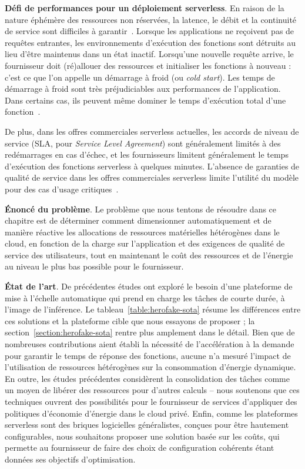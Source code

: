 \textbf{Défi de performances pour un déploiement serverless}. En raison de la nature éphémère des ressources non réservées, la latence, le débit et la continuité de service sont difficiles à garantir~\cite{vaneykSPECRGCloud2018, dartoisCuckooOpportunisticMapReduce2019}. Lorsque les applications ne reçoivent pas de requêtes entrantes, les environnements d'exécution des fonctions sont détruits au lieu d'être maintenus dans un état inactif. Lorsqu'une nouvelle requête arrive, le fournisseur doit (ré)allouer des ressources et initialiser les fonctions à nouveau : c'est ce que l'on appelle un démarrage à froid (ou \textit{cold start}). Les temps de démarrage à froid sont très préjudiciables aux performances de l'application. Dans certains cas, ils peuvent même dominer le temps d'exécution total d'une fonction~\cite{mullerLambadaInteractiveData2020}.

De plus, dans les offres commerciales serverless actuelles, les accords de niveau de service (SLA, pour \textit{Service Level Agreement}) sont généralement limités à des redémarrages en cas d'échec, et les fournisseurs limitent généralement le temps d'exécution des fonctions serverless à quelques minutes. L'absence de garanties de qualité de service dans les offres commerciales serverless limite l'utilité du modèle pour des cas d'usage critiques~\cite{buyyaSLAorientedResourceProvisioning2011}.

\textbf{Énoncé du problème}. Le problème que nous tentons de résoudre dans ce chapitre est de déterminer comment dimensionner automatiquement et de manière réactive les allocations de ressources matérielles hétérogènes dans le cloud, en fonction de la charge sur l'application et des exigences de qualité de service des utilisateurs, tout en maintenant le coût des ressources et de l'énergie au niveau le plus bas possible pour le fournisseur.

\textbf{État de l'art}. De précédentes études ont exploré le besoin d'une plateforme de mise à l'échelle automatique qui prend en charge les tâches de courte durée, à l'image de l'inférence. Le tableau~\ref{table:herofake-sota} résume les différences entre ces solutions et la plateforme cible que nous essayons de proposer ; la section~\ref{section:herofake-sota} rentre plus amplement dans le détail. Bien que de nombreuses contributions aient établi la nécessité de l'accélération à la demande pour garantir le temps de réponse des fonctions, aucune n'a mesuré l'impact de l'utilisation de ressources hétérogènes sur la consommation d'énergie dynamique. En outre, les études précédentes considèrent la consolidation des tâches comme un moyen de libérer des ressources pour d'autres calculs -- nous soutenons que ces techniques ouvrent des possibilités pour le fournisseur de services d'appliquer des politiques d'économie d'énergie dans le cloud privé. Enfin, comme les plateformes serverless sont des briques logicielles généralistes, conçues pour être hautement configurables, nous souhaitons proposer une solution basée sur les coûts, qui permette au fournisseur de faire des choix de configuration cohérents étant données ses objectifs d'optimisation.

